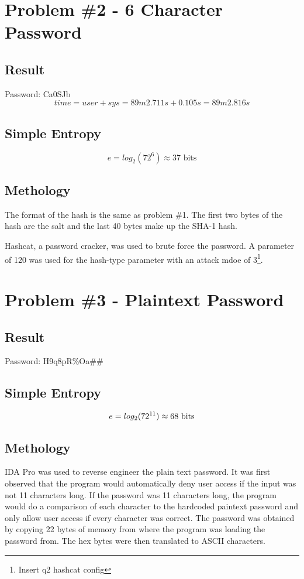 \documentclass[conference]{IEEEtran}
\begin{document}
\section{Problem \#2 - 6 Character Password}

\subsection{Result}
  \noindent Password: Ca0SJb
  \begin{displaymath}
  time = user + sys = 89m2.711s + 0.105s = 89m2.816s
  \end{displaymath}

\subsection{Simple Entropy}
  \begin{displaymath}
    e = log_2(72^6) \approx 37 \mbox{ bits}
  \end{displaymath}

\subsection{Methology}

The format of the hash is the same as problem \#1. The first two bytes of the
hash are the salt and the last 40 bytes make up the SHA-1 hash.

Hashcat, a password cracker, was used to brute force the password. A parameter
of 120 was used for the hash-type parameter with an attack mdoe of
3\footnote{Insert q2 hashcat config}.

\section{Problem \#3 - Plaintext Password}
\subsection{Result}
  \noindent Password: H9q8pR\%Oa\#\#

\subsection{Simple Entropy}
  \begin{displaymath}
    e = log_2(72^{11}) \approx 68 \mbox{ bits}\\
  \end{displaymath}

\subsection{Methology}
IDA Pro was used to reverse engineer the plain text password. It was first
observed that the program would automatically deny user access if the input was
not 11 characters long. If the password was 11 characters long, the program
would do a comparison of each character to the hardcoded paintext password and
only allow user access if every character was correct. The password was obtained
by copying 22 bytes of memory from where the program was loading the password
from. The hex bytes were then translated to ASCII characters.
\end{document}
